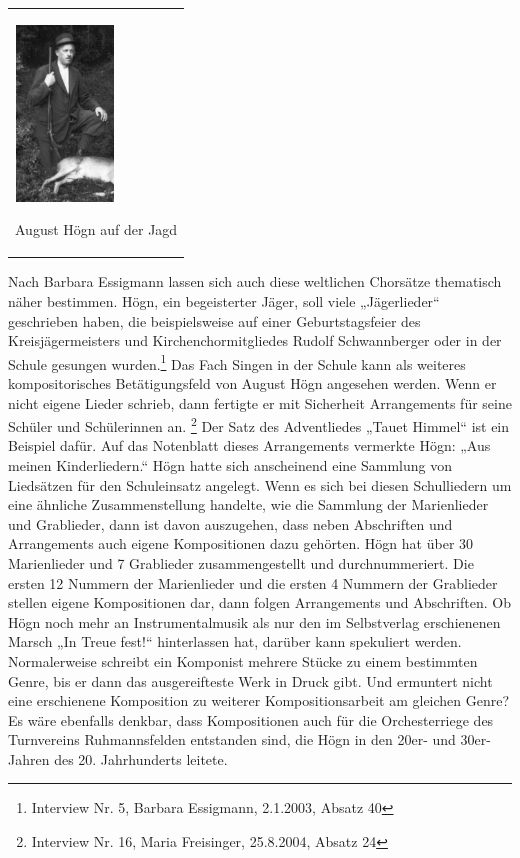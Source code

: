 \begin{flushleft}
\tablefirsthead{}
\tablehead{}
\tabletail{}
\tablelasttail{}
\begin{supertabular}{m{2.809cm}}

\begin{center}

\includegraphics[width=2.626cm,height=4.68cm]{pictures/zulassungsarbeit-img068.jpg}

\end{center}
August Högn auf der Jagd\\
\end{supertabular}
\end{flushleft}
Nach Barbara Essigmann lassen sich auch diese weltlichen Chorsätze
thematisch näher bestimmen. Högn, ein begeisterter Jäger, soll viele
„Jägerlieder“ geschrieben haben, die beispielsweise auf einer
Geburtstagsfeier des Kreisjägermeisters und Kirchenchormitgliedes
Rudolf Schwannberger oder in der Schule gesungen wurden.\footnote{
Interview Nr. 5, Barbara Essigmann, 2.1.2003, Absatz 40} Das Fach
Singen in der Schule kann als weiteres kompositorisches Betätigungsfeld
von August Högn angesehen werden. Wenn er nicht eigene Lieder schrieb,
dann fertigte er mit Sicherheit Arrangements für seine Schüler und
Schülerinnen an. \footnote{Interview Nr. 16, Maria Freisinger,
25.8.2004, Absatz 24} Der Satz des Adventliedes „Tauet Himmel“ ist ein
Beispiel dafür. Auf das Notenblatt dieses Arrangements vermerkte Högn:
„Aus meinen Kinderliedern.“ Högn hatte sich anscheinend eine Sammlung
von Liedsätzen für den Schuleinsatz angelegt. Wenn es sich bei diesen
Schulliedern um eine ähnliche Zusammenstellung handelte, wie die
Sammlung der Marienlieder und Grablieder, dann ist davon auszugehen,
dass neben Abschriften und Arrangements auch eigene Kompositionen dazu
gehörten. Högn hat über 30 Marienlieder und 7 Grablieder
zusammengestellt und durchnummeriert. Die ersten 12 Nummern der
Marienlieder und die ersten 4 Nummern der Grablieder stellen eigene
Kompositionen dar, dann folgen Arrangements und Abschriften. Ob Högn
noch mehr an Instrumentalmusik als nur den im Selbstverlag erschienenen
Marsch „In Treue fest!“ hinterlassen hat, darüber kann spekuliert
werden. Normalerweise schreibt ein Komponist mehrere Stücke zu einem
bestimmten Genre, bis er dann das ausgereifteste Werk in Druck gibt.
Und ermuntert nicht eine erschienene Komposition zu weiterer
Kompositionsarbeit am gleichen Genre? Es wäre ebenfalls denkbar, dass
Kompositionen auch für die Orchesterriege des Turnvereins
Ruhmannsfelden entstanden sind, die Högn in den 20er- und 30er-Jahren
des 20. Jahrhunderts leitete.
